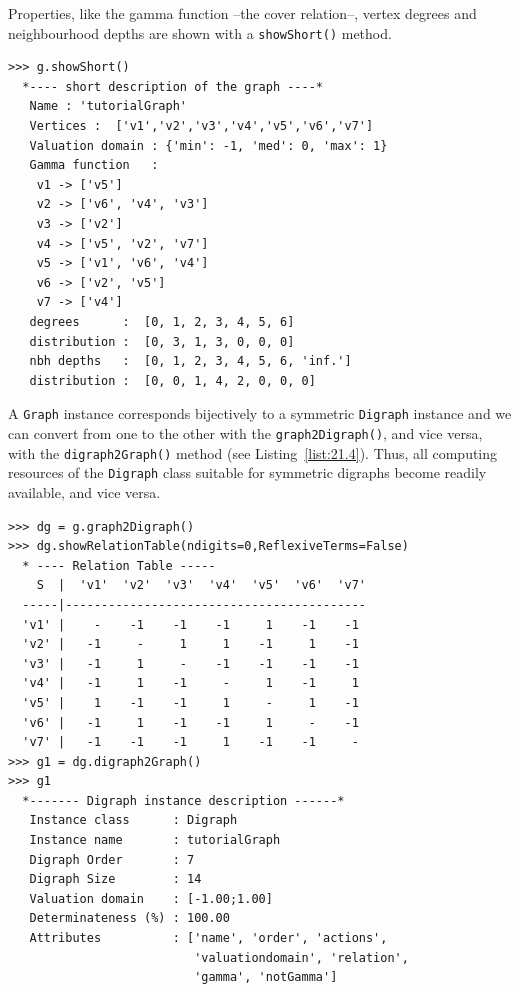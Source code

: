 Properties, like the gamma function --the cover relation--, vertex degrees and neighbourhood depths are shown with a \texttt{showShort()} method. 
\begin{lstlisting}[caption={Inspecting a graph instance},label=list:21.3]
>>> g.showShort()
  *---- short description of the graph ----*
   Name : 'tutorialGraph'
   Vertices :  ['v1','v2','v3','v4','v5','v6','v7']
   Valuation domain : {'min': -1, 'med': 0, 'max': 1}
   Gamma function   : 
    v1 -> ['v5']
    v2 -> ['v6', 'v4', 'v3']
    v3 -> ['v2']
    v4 -> ['v5', 'v2', 'v7']
    v5 -> ['v1', 'v6', 'v4']
    v6 -> ['v2', 'v5']
    v7 -> ['v4']
   degrees      :  [0, 1, 2, 3, 4, 5, 6]
   distribution :  [0, 3, 1, 3, 0, 0, 0]
   nbh depths   :  [0, 1, 2, 3, 4, 5, 6, 'inf.']
   distribution :  [0, 0, 1, 4, 2, 0, 0, 0]
\end{lstlisting}

A \texttt{Graph} instance corresponds bijectively to a symmetric \texttt{Digraph} instance and we can convert from one to the other with the \texttt{graph2Digraph()}, and vice versa, with the \texttt{digraph2Graph()} method (see Listing~\vref{list:21.4}). Thus, all computing resources of the \texttt{Digraph} class suitable for symmetric digraphs become readily available, and vice versa.
\begin{lstlisting}[caption={Conversion between graphs and digraphs},label=list:21.4]
>>> dg = g.graph2Digraph()
>>> dg.showRelationTable(ndigits=0,ReflexiveTerms=False)
  * ---- Relation Table -----
    S  |  'v1'  'v2'  'v3'  'v4'  'v5'  'v6'  'v7'	  
  -----|------------------------------------------
  'v1' |    -    -1    -1    -1     1    -1    -1	 
  'v2' |   -1     -     1     1    -1     1    -1	 
  'v3' |   -1     1     -    -1    -1    -1    -1	 
  'v4' |   -1     1    -1     -     1    -1     1	 
  'v5' |    1    -1    -1     1     -     1    -1	 
  'v6' |   -1     1    -1    -1     1     -    -1	 
  'v7' |   -1    -1    -1     1    -1    -1     -
>>> g1 = dg.digraph2Graph()
>>> g1
  *------- Digraph instance description ------*
   Instance class      : Digraph
   Instance name       : tutorialGraph
   Digraph Order       : 7
   Digraph Size        : 14
   Valuation domain    : [-1.00;1.00]
   Determinateness (%) : 100.00
   Attributes          : ['name', 'order', 'actions',
                          'valuationdomain', 'relation',
                          'gamma', 'notGamma']
\end{lstlisting}

